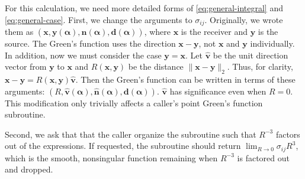 \documentclass[11pt]{article}
\renewcommand{\vec}[1]{\boldsymbol{#1}}
\newcommand{\uvec}[1]{\hat{\boldsymbol{#1}}}
\begin{document}
For this calculation, we need more detailed forms of \eqref{eq:general-integral} and \eqref{eq:general-case}.
First, we change the arguments to $\sigma_{ij}$.
Originally, we wrote them as $(\vec{x}, \vec{y}(\vec{\alpha}), \uvec{n}(\vec{\alpha}), \vec{d}(\vec{\alpha}))$,
where $\vec{x}$ is the receiver and $\vec{y}$ is the source.
The Green's function uses the direction $\vec{x} - \vec{y}$,
not $\vec{x}$ and $\vec{y}$ individually.
In addition, now we must consider the case $\vec{y} = \vec{x}$.
Let $\uvec{v}$ be the unit direction vector from $\vec{y}$ to $\vec{x}$
and $R(\vec{x},\vec{y})$ be the distance $\|\vec{x}-\vec{y}\|_2$.
Thus, for clarity, $\vec{x}-\vec{y} = R(\vec{x},\vec{y}) \uvec{v}$.
Then the Green's function can be written in terms of these arguments:
$(R, \uvec{v}(\vec{\alpha}), \uvec{n}(\vec{\alpha}), \vec{d}(\vec{\alpha}))$.
$\uvec{v}$ has significance even when $R=0$.
This modification only trivially affects a caller's point Green's function subroutine.

Second, we ask that that the caller organize the subroutine such that $R^{-3}$ factors out of the expressions.
If requested, the subroutine should return $\lim_{R \rightarrow 0} \sigma_{ij} R^3$,
which is the smooth, nonsingular function remaining when $R^{-3}$ is factored out and dropped.
\end{document}
